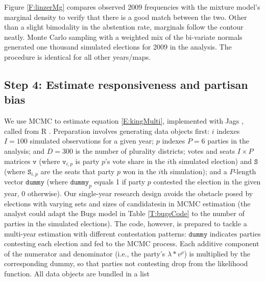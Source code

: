 \documentclass[letter,12pt]{article}
\begin{document}
Figure \ref{F:linzerMg} compares observed 2009 frequencies with the mixture model's marginal density to verify that there is a good match between the two. Other than a slight bimodality in the abstention rate, marginals follow the contour neatly. Monte Carlo sampling with a weighted mix of the bi-variate normals generated one thousand simulated elections for 2009 in the analysis. The procedure is identical for all other years/maps. 


\subsection*{Step 4: Estimate responsiveness and partisan bias}

We use MCMC to estimate equation \ref{E:kingMulti}, implemented with Jags \citep{jags.cite}, called from R \citep{r.cite}. Preparation involves generating data objects first: $i$ indexes $I=100$ simulated observations for a given year; $p$ indexes $P=6$ parties in the analysis; and $D=300$ is the number of plurality districts; votes and seats $I\times P$ matrices $\texttt{v}$ (where $\texttt{v}_{i,p}$ is party $p$'s vote share in the $i$th simulated election) and $\texttt{S}$ (where $\texttt{S}_{i,p}$ are the seats that party $p$ won in the $i$th simulation); and a $P$-length vector $\texttt{dummy}$ (where $\texttt{dummy}_p$ equals 1 if party $p$ contested the election in the given year, 0 otherwise). Our single-year research design avoids the obstacle posed by elections with varying sets and sizes of candidatesin in MCMC estimation (the analyst could adapt the Bugs model in Table \ref{T:bugsCode} to the number of parties in the simulated elections). The code, however, is prepared to tackle a multi-year estimation with different contestation patterns: $\texttt{dummy}$ indicates parties contesting each election and fed to the MCMC process. Each additive component of the numerator and denominator (i.e., the party's $\lambda * v^\rho$) is multiplied by the corresponding dummy, so that parties not contesting drop from the likelihood function. All data objects are bundled in a list 
\end{document}
